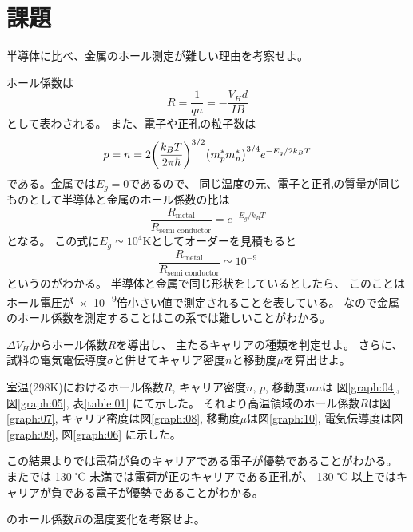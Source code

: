 \documentclass[11pt,dvipdfmx,a4paper]{jsarticle}
\numberwithin{equation}{section}
\begin{document}
\section{課題}
\begin{tcolorbox}[title=課題1]
	半導体に比べ、金属のホール測定が難しい理由を考察せよ。
\end{tcolorbox}
ホール係数は
\begin{equation}
	R = \frac{1}{qn} = -\frac{V_H d}{I B}
\end{equation}
として表わされる。
また、電子や正孔の粒子数は
\begin{equation}
	p=n=2\qty(\frac{k_B T}{2\pi\hbar})^{3/2}\qty(m_p^*m_n^*)^{3/4} e^{-E_g/2k_BT}
\end{equation}
である。金属では\(E_g=0\)であるので、
同じ温度の元、電子と正孔の質量が同じものとして半導体と金属のホール係数の比は
\begin{equation}
	\frac{R_{\text{metal}}}{R_{\text{semi conductor}}}  = e^{-E_g/k_BT}
\end{equation}
となる。
この式に\(E_g\simeq 10^4 \text{K}\)としてオーダーを見積もると
\begin{equation}
	\frac{R_{\text{metal}}}{R_{\text{semi conductor}}}\simeq 10^{-9}
\end{equation}
というのがわかる。
半導体と金属で同じ形状をしているとしたら、
このことはホール電圧が\num{e-9}倍小さい値で測定されることを表している。
なので金属のホール係数を測定することはこの系では難しいことがわかる。
\\

\begin{tcolorbox}[title=課題2]
	\(\Delta V_H\)からホール係数\(R\)を導出し、
	主たるキャリアの種類を判定せよ。
	さらに、試料の電気電伝導度\(\sigma\)と併せてキャリア密度\(n\)と移動度\(\mu\)を算出せよ。
\end{tcolorbox}
室温(298K)におけるホール係数\(R\), キャリア密度\(n,\, p\), 移動度\(mu\)は
図\ref{graph:04}, 図\ref{graph:05}, 表\ref{table:01} にて示した。
それより高温領域のホール係数\(R\)は図\ref{graph:07}, キャリア密度は図\ref{graph:08}, 移動度\(\mu\)は図\ref{graph:10},
電気伝導度は図\ref{graph:09}, 図\ref{graph:06} に示した。

この結果よりでは電荷が負のキャリアである電子が優勢であることがわかる。
またでは 130 ℃ 未満では電荷が正のキャリアである正孔が、
130 ℃ 以上ではキャリアが負である電子が優勢であることがわかる。
\\

\begin{tcolorbox}[title=課題4]
	のホール係数\(R\)の温度変化を考察せよ。
\end{tcolorbox}
\end{document}
